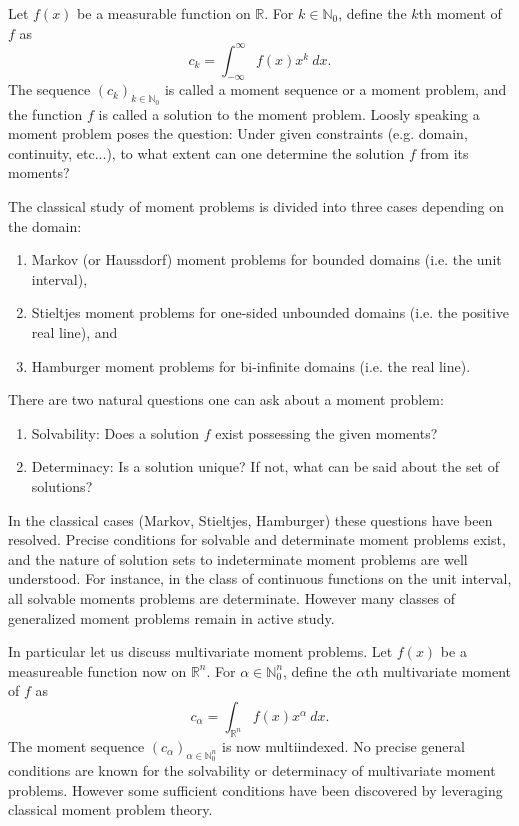 \documentclass{amsart}
\theoremstyle{remark}
\numberwithin{equation}{section}
\newcommand{\RR}{\mathbb{R}}
\newcommand{\NN}{\mathbb{N}}
\begin{document}
Let $f(x)$ be a measurable function on $\RR$. For $k \in \NN_0$, define the $k$th moment of $f$ as
\[
    c_k = \int_{-\infty}^\infty f(x)x^k ~dx.
\]
The sequence $(c_k)_{k \in \NN_0}$ is called a moment sequence or a moment problem, and the function $f$ is called a solution to the moment problem. Loosly speaking a moment problem poses the question: Under given constraints (e.g. domain, continuity, etc...), to what extent can one determine the solution $f$ from its moments?

The classical study of moment problems is divided into three cases depending on the domain: 
\begin{enumerate}
\item Markov (or Haussdorf) moment problems for bounded domains (i.e. the unit interval), 
\item Stieltjes moment problems for one-sided unbounded domains (i.e. the positive real line), and 
\item Hamburger moment problems for bi-infinite domains (i.e. the real line).
\end{enumerate}

There are two natural questions one can ask about a moment problem:
\begin{enumerate}
\item Solvability: Does a solution $f$ exist possessing the given moments?
\item Determinacy: Is a solution unique? If not, what can be said about the set of solutions?
\end{enumerate}
In the classical cases (Markov, Stieltjes, Hamburger) these questions have been resolved. Precise conditions for solvable and determinate moment problems exist, and the nature of solution sets to indeterminate moment problems are well understood. For instance, in the class of continuous functions on the unit interval, all solvable moments problems are determinate. However many classes of generalized moment problems remain in active study.

In particular let us discuss multivariate moment problems. Let $f(x)$ be a measureable function now on $\RR^n$. For $\alpha \in \NN_0^n$, define the $\alpha$th multivariate moment of $f$ as 
\[
    c_\alpha = \int_{\RR^n} f(x)x^\alpha ~ dx.
\]
The moment sequence $(c_\alpha)_{\alpha \in \NN_0^n}$ is now multiindexed. No precise general conditions are known for the solvability or determinacy of multivariate moment problems. However some sufficient conditions have been discovered by leveraging classical moment problem theory. 
\end{document}
